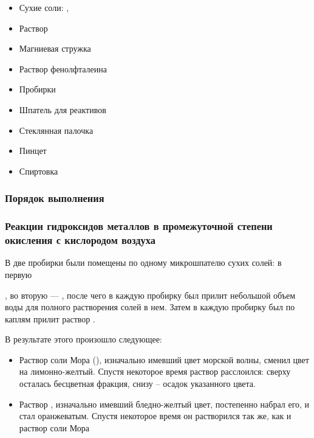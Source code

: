 \documentclass[a4paper, 12pt]{article}
\begin{document}
\begin{itemize}
	\item Сухие соли: , 
	
	\item Раствор 
	
	\item Магниевая стружка
	
	\item Раствор фенолфталеина
	
	\item Пробирки
	\item Шпатель для реактивов
	\item Стеклянная палочка
	\item Пинцет
	\item Спиртовка
\end{itemize}


\subsubsection{Порядок выполнения}

\subsubsection*{Реакции гидроксидов металлов в промежуточной степени окисления с кислородом воздуха}

В две пробирки были помещены по одному микрошпателю сухих солей: в первую 

\noindent{}, во вторую --- , после чего в каждую пробирку был прилит небольшой объем воды для полного растворения солей в нем. Затем в каждую пробирку был по каплям прилит раствор .

В результате этого произошло следующее:

\begin{itemize}
	\item Раствор соли Мора (), изначально имевший цвет морской волны, сменил цвет на лимонно-желтый. Спустя некоторое время раствор расслоился: сверху осталась бесцветная фракция, снизу -- осадок указанного цвета.
	
	\item Раствор , изначально имевший бледно-желтый цвет, постепенно набрал его, и стал оранжеватым. Спустя некоторое время он растворился так же, как и раствор соли Мора
\end{itemize}
\end{document}
